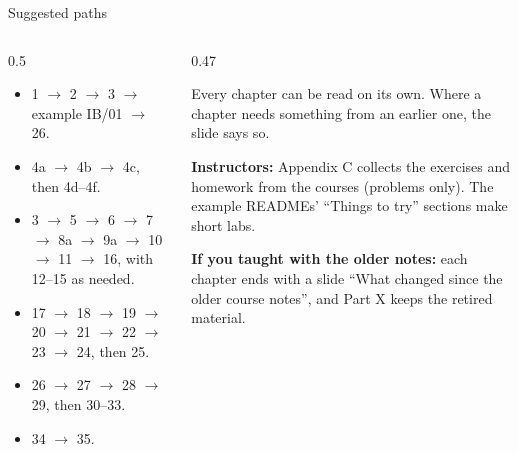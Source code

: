 \documentclass[aspectratio=169,11pt]{beamer}
\begin{document}
\begin{frame}{Suggested paths}
\begin{columns}[T,onlytextwidth]
\begin{column}{0.5\textwidth}
\begin{itemize}
  \item {} 1 $\to$ 2 $\to$ 3 $\to$ example IB/01 $\to$ 26.
  \item {} 4a $\to$ 4b $\to$ 4c, then 4d--4f.
  \item {} 3 $\to$ 5 $\to$ 6 $\to$ 7 $\to$ 8a $\to$ 9a $\to$ 10 $\to$ 11 $\to$ 16, with 12--15 as needed.
  \item {} 17 $\to$ 18 $\to$ 19 $\to$ 20 $\to$ 21 $\to$ 22 $\to$ 23 $\to$ 24, then 25.
  \item {} 26 $\to$ 27 $\to$ 28 $\to$ 29, then 30--33.
  \item {} 34 $\to$ 35.
\end{itemize}
\end{column}
\begin{column}{0.47\textwidth}
\begin{punchbox}
\small Every chapter can be read on its own. Where a chapter needs something from an earlier one, the slide says so.
\end{punchbox}
\vspace{2mm}
\small \textbf{Instructors:} Appendix C collects the exercises and homework from the courses (problems only). The example READMEs' ``Things to try'' sections make short labs.
\vspace{2mm}

\small \textbf{If you taught with the older notes:} each chapter ends with a slide ``What changed since the older course notes'', and Part X keeps the retired material.
\end{column}
\end{columns}
\end{frame}
\end{document}
